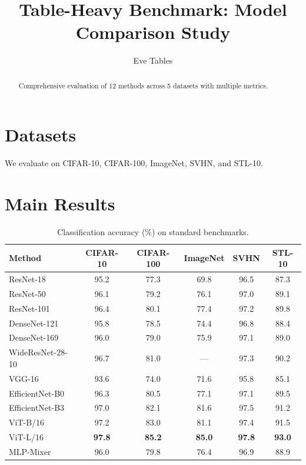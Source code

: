 \documentclass{article}
\title{Table-Heavy Benchmark: Model Comparison Study}
\author{Eve Tables}
\begin{document}
\maketitle

\begin{abstract}
Comprehensive evaluation of 12 methods across 5 datasets with multiple metrics.
\end{abstract}

\section{Datasets}

We evaluate on CIFAR-10, CIFAR-100, ImageNet, SVHN, and STL-10.

\section{Main Results}

\begin{table}[h]
\caption{Classification accuracy (\%) on standard benchmarks.}
\label{tab:main}
\centering
\begin{tabular}{lccccc}
\toprule
\textbf{Method} & \textbf{CIFAR-10} & \textbf{CIFAR-100} & \textbf{ImageNet} & \textbf{SVHN} & \textbf{STL-10} \\
\midrule
ResNet-18       & 95.2 & 77.3 & 69.8 & 96.5 & 87.3 \\
ResNet-50       & 96.1 & 79.2 & 76.1 & 97.0 & 89.1 \\
ResNet-101      & 96.4 & 80.1 & 77.4 & 97.2 & 89.8 \\
DenseNet-121    & 95.8 & 78.5 & 74.4 & 96.8 & 88.4 \\
DenseNet-169    & 96.0 & 79.0 & 75.9 & 97.1 & 89.0 \\
WideResNet-28-10 & 96.7 & 81.0 & --- & 97.3 & 90.2 \\
VGG-16          & 93.6 & 74.0 & 71.6 & 95.8 & 85.1 \\
EfficientNet-B0 & 96.3 & 80.5 & 77.1 & 97.1 & 89.5 \\
EfficientNet-B3 & 97.0 & 82.1 & 81.6 & 97.5 & 91.2 \\
ViT-B/16        & 97.2 & 83.0 & 81.1 & 97.4 & 91.5 \\
ViT-L/16        & \textbf{97.8} & \textbf{85.2} & \textbf{85.0} & \textbf{97.8} & \textbf{93.0} \\
MLP-Mixer       & 96.0 & 79.8 & 76.4 & 96.9 & 88.9 \\
\bottomrule
\end{tabular}
\end{table}
\end{document}
